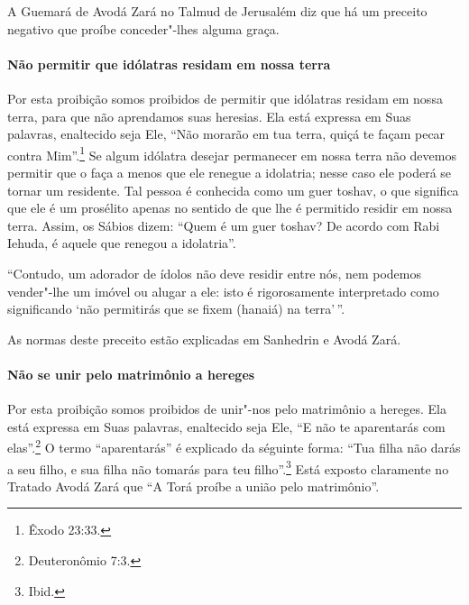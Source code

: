 \begin{multicols}{2}
A Guemará\starr{} de Avodá Zará\starr{} no Talmud\starr{} de Jerusalém diz que há um preceito
negativo que proíbe conceder"-lhes alguma graça.

\paragraph{Não permitir que idólatras residam em nossa terra}

Por esta proibição somos proibidos de permitir que idólatras residam em
nossa terra, para que não aprendamos suas heresias. Ela está expressa em
Suas palavras, enaltecido seja Ele, ``Não morarão em tua terra, quiçá te
façam pecar contra Mim''.\footnote{Êxodo 23:33.} Se algum idólatra desejar
permanecer em nossa terra não devemos permitir que o faça a menos que
ele renegue a idolatria; nesse caso ele poderá se tornar um residente.
Tal pessoa é conhecida como um guer toshav\starr, o que significa que ele
é um prosélito apenas no sentido de que lhe é permitido residir em
nossa terra. Assim, os Sábios dizem: ``Quem é um guer toshav\starr? De
acordo com Rabi Iehuda\starr, é aquele que renegou a idolatria''.

``Contudo, um adorador de ídolos não deve residir entre nós, nem podemos
vender"-lhe um imóvel ou alugar a ele: isto é rigorosamente interpretado
como significando `não permitirás que se fixem (hanaiá\starr) na terra'\,''.

As normas deste preceito estão explicadas em Sanhedrin\starr{} e Avodá Zará\starr.

\paragraph{Não se unir pelo matrimônio a hereges}

Por esta proibição somos proibidos de unir"-nos pelo matrimônio a
hereges. Ela está expressa em Suas palavras, enaltecido seja Ele, ``E
não te aparentarás com elas''.\footnote{Deuteronômio 7:3.} O termo
``aparentarás'' é explicado da séguinte forma: ``Tua filha não darás a
seu filho, e sua filha não tomarás para teu filho''.\footnote{Ibid.} Está
exposto claramente no Tratado Avodá Zará\starr{} que ``A Torá\starr{} proíbe a união
pelo matrimônio''.


\end{multicols}
